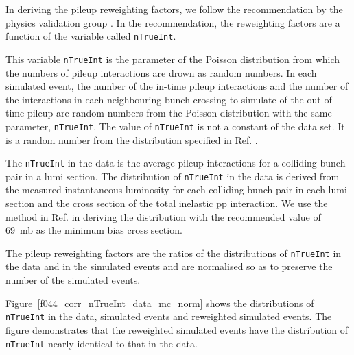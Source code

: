 In deriving the pileup reweighting factors, we follow the
recommendation by the physics validation group
\cite{twiki-PdmVPileUpDescription, twiki-PileupJSONFileforData}. In
the recommendation, the reweighting factors are a function of the
variable called \verb!nTrueInt!.

This variable \verb!nTrueInt! is the parameter of the Poisson
distribution from which the numbers of pileup interactions are drown
as random numbers. In each simulated event, the number of the in-time
pileup interactions and the number of the interactions in each
neighbouring bunch crossing to simulate of the out-of-time pileup are
random numbers from the Poisson distribution with the same parameter,
\verb!nTrueInt!. The value of \verb!nTrueInt! is not a constant of the
data set. It is a random number from the distribution specified in
Ref. \cite{github-mix_2015_25ns_Startup_PoissonOOTPU_cfi}.

The \verb!nTrueInt! in the data is the average pileup interactions for
a colliding bunch pair in a lumi section. The distribution of
\verb!nTrueInt! in the data is derived from the measured instantaneous
luminosity for each colliding bunch pair in each lumi section and the
cross section of the total inelastic pp interaction. We use the method
in Ref. \cite{twiki-PileupJSONFileforData} in deriving the
distribution with the recommended value of 69~mb as the minimum bias
cross section.

The pileup reweighting factors are the ratios of the distributions of
\verb!nTrueInt! in the data and in the simulated events and are
normalised so as to preserve the number of the simulated events.

Figure~\ref{f044_corr_nTrueInt_data_mc_norm} shows the distributions
of \verb!nTrueInt! in the data, simulated events and reweighted
simulated events. The figure demonstrates that the reweighted
simulated events have the distribution of \verb!nTrueInt! nearly
identical to that in the data.

